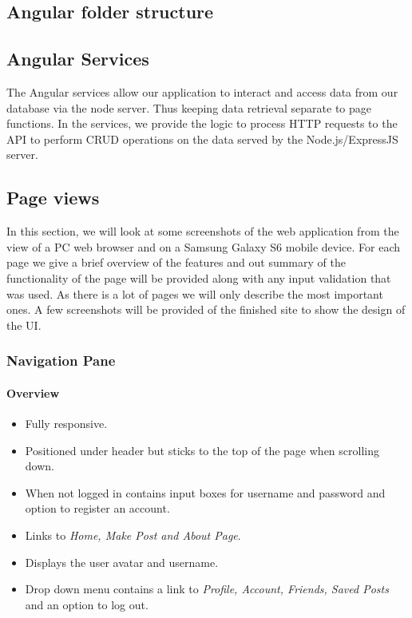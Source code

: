 \subsection{Angular folder structure}

\subsection{Angular Services}
The Angular services allow our application to interact and access data from our database via the node server. Thus keeping data retrieval separate to page functions. In the services, we provide the logic to process HTTP requests to the API to perform CRUD operations on the data served by the Node.js/ExpressJS server. 

\subsection{Page views}
In this section, we will look at some screenshots of the web application from the view of a PC web browser and on a Samsung Galaxy S6 mobile device. For each page we give a brief overview of the features and out summary of the functionality of the page will be provided along with any input validation that was used. As there is a lot of pages we will only describe the most important ones. A few screenshots will be provided of the finished site to show the design of the UI.


\subsubsection{Navigation Pane}
\paragraph{Overview\newline}

\begin{itemize}
    \item Fully responsive.
    \item Positioned under header but sticks to the top of the page when scrolling down.
    \item When not logged in contains input boxes for username and password and option to register an account.
    \item Links to \textit{Home, Make Post and About Page}.
    \item Displays the user avatar and username.
    \item Drop down menu contains a link to \textit{Profile, Account, Friends, Saved Posts} and an option to log out.
\end{itemize}

